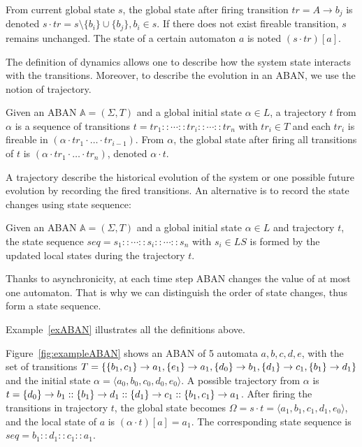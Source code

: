 \begin{definition}[Dynamics]\label{def:ABANdynamics}
    From current global state $s$, the global state after firing transition $tr=A\to b_j$ is denoted $s \cdot tr = s \setminus \{b_i\} \cup \{b_j\}, b_i \in s$.
    If there does not exist fireable transition, $s$ remains unchanged.
    The state of a certain automaton $a$ is noted $(s\cdot tr)[a]$.
\end{definition}

The definition of dynamics allows one to describe how the system state interacts with the transitions. 
Moreover, to describe the evolution in an ABAN, we use the notion of trajectory.

\begin{definition}[Trajectory]
Given an ABAN $\mathbb{A} = (\Sigma,T)$ and a global initial state $\alpha\in L$, a trajectory $t$ from $\alpha$ is a sequence of transitions $t=tr_1::\cdots :: tr_i::\cdots ::tr_n$ with $tr_i\in T$ and each $tr_i$ is fireable in $(\alpha \cdot tr_1 \cdot \ldots \cdot tr_{i-1})$.
From $\alpha$, the global state after firing all transitions of $t$ is $(\alpha \cdot tr_1 \cdot \ldots \cdot tr_n)$, denoted $\alpha \cdot t$.
\end{definition}

A trajectory describe the historical evolution of the system or one possible future evolution by recording the fired transitions. 
An alternative is to record the state changes using state sequence:

\begin{definition}
Given an ABAN $\mathbb{A} = (\Sigma,T)$ and a global initial state $\alpha\in L$ and trajectory $t$, the state sequence $seq=s_1::\cdots :: s_i::\cdots ::s_n$ with $s_i\in LS$ is formed by the updated local states during the trajectory $t$.
\end{definition}

Thanks to asynchronicity, at each time step ABAN changes the value of at most one automaton.
That is why we can distinguish the order of state changes, thus form a state sequence.

Example~\ref{exABAN} illustrates all the definitions above.
\begin{example}\label{exABAN}
    Figure~\ref{fig:exampleABAN} shows an ABAN of 5 automata $a,b,c,d,e$, with the set of transitions $T=\{\acm{b_1,c_1}{a_0}{a_1},\acm{e_1}{a_0}{a_1},\acm{d_0}{b_0}{b_1},\acm{d_1}{c_0}{c_1},\acm{b_1}{d_0}{d_1}\}$ and the initial state $\alpha=\langle a_0,b_0,c_0,d_0,e_0\rangle$.
    A possible trajectory from $\alpha$ is $t=\acm{d_0}{b_0}{b_1}::\acm{b_1}{d_0}{d_1}::\acm{d_1}{c_0}{c_1}::\acm{b_1,c_1}{a_0}{a_1}$.
    After firing the transitions in trajectory $t$, the global state becomes $\Omega=s\cdot t=\langle a_1,b_1,c_1,d_1,e_0\rangle$, and the local state of $a$ is $(\alpha\cdot t)[a]=a_1$. 
    The corresponding state sequence is $seq=b_1::d_1::c_1::a_1$.
\end{example}

